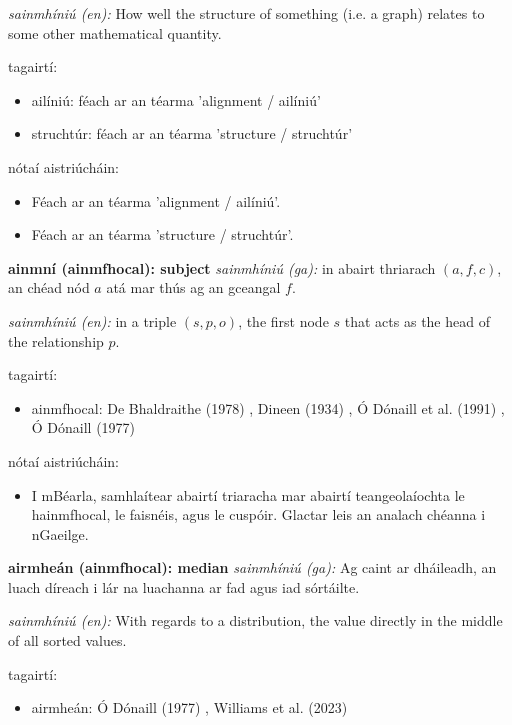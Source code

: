 \documentclass{article}
\begin{document}
\textit{sainmhíniú (en):} How well the structure of something (i.e. a graph) relates to some other mathematical quantity.

tagairtí:
\begin{itemize}
	\item ailíniú: féach ar an téarma 'alignment / ailíniú'
	\item struchtúr: féach ar an téarma 'structure / struchtúr'
\end{itemize}

nótaí aistriúcháin:
\begin{itemize}
	\item Féach ar an téarma 'alignment / ailíniú'.
	\item Féach ar an téarma 'structure / struchtúr'.
\end{itemize}


\textbf{ainmní (ainmfhocal): subject}
\textit{sainmhíniú (ga):} in abairt thriarach $(a,f,c)$, an chéad nód $a$ atá mar thús ag an gceangal $f$.

\textit{sainmhíniú (en):} in a triple $(s,p,o)$, the first node $s$ that acts as the head of the relationship $p$.

tagairtí:
\begin{itemize}
	\item ainmfhocal: De Bhaldraithe (1978) \cite{de-bhaldraithe}, Dineen (1934) \cite{dineen}, Ó Dónaill et al. (1991) \cite{focloir-beag}, Ó Dónaill (1977) \cite{odonaill}
\end{itemize}

nótaí aistriúcháin:
\begin{itemize}
	\item I mBéarla, samhlaítear abairtí triaracha mar abairtí teangeolaíochta le hainmfhocal, le faisnéis, agus le cuspóir. Glactar leis an analach chéanna i nGaeilge.
\end{itemize}


\textbf{airmheán (ainmfhocal): median}
\textit{sainmhíniú (ga):} Ag caint ar dháileadh, an luach díreach i lár na luachanna ar fad agus iad sórtáilte.

\textit{sainmhíniú (en):} With regards to a distribution, the value directly in the middle of all sorted values.

tagairtí:
\begin{itemize}
	\item airmheán: Ó Dónaill (1977) \cite{odonaill}, Williams et al. (2023) \cite{storchiste}
\end{itemize}
\end{document}
